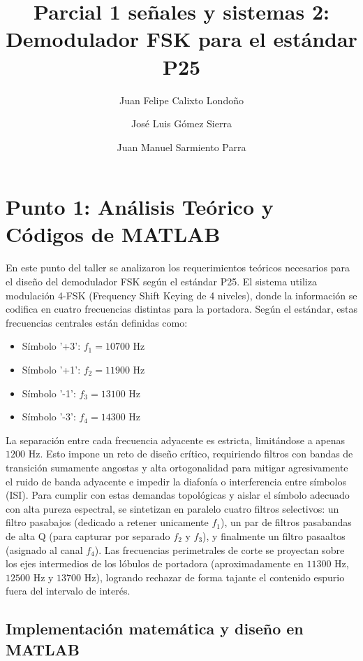 \documentclass[9pt,a4paper,oneside]{rho-class/rho}
\title{Parcial 1 señales y sistemas 2: Demodulador FSK para el estándar P25}
\author[a,1]{Juan Felipe Calixto Londoño}
\author[a,2]{José Luis Gómez Sierra}
\author[a,3]{Juan Manuel Sarmiento Parra}
\affil[a]{Universidad Nacional de Colombia, Facultad de Ingeniería}
\begin{document}
    \maketitle
    \thispagestyle{firststyle}


\section{Punto 1: Análisis Teórico y Códigos de MATLAB}

    En este punto del taller se analizaron los requerimientos teóricos necesarios para el diseño del demodulador FSK según el estándar P25. El sistema utiliza modulación 4-FSK (Frequency Shift Keying de 4 niveles), donde la información se codifica en cuatro frecuencias distintas para la portadora. Según el estándar, estas frecuencias centrales están definidas como:
    \begin{itemize}
        \item Símbolo '+3': $f_1 = 10700$ Hz
        \item Símbolo '+1': $f_2 = 11900$ Hz
        \item Símbolo '-1': $f_3 = 13100$ Hz
        \item Símbolo '-3': $f_4 = 14300$ Hz
    \end{itemize}
    La separación entre cada frecuencia adyacente es estricta, limitándose a apenas $1200$ Hz. Esto impone un reto de diseño crítico, requiriendo filtros con bandas de transición sumamente angostas y alta ortogonalidad para mitigar agresivamente el ruido de banda adyacente e impedir la diafonía o interferencia entre símbolos (ISI). Para cumplir con estas demandas topológicas y aislar el símbolo adecuado con alta pureza espectral, se sintetizan en paralelo cuatro filtros selectivos: un filtro pasabajos (dedicado a retener unicamente $f_1$), un par de filtros pasabandas de alta Q (para capturar por separado $f_2$ y $f_3$), y finalmente un filtro pasaaltos (asignado al canal $f_4$). Las frecuencias perimetrales de corte se proyectan sobre los ejes intermedios de los lóbulos de portadora (aproximadamente en $11300$ Hz, $12500$ Hz y $13700$ Hz), logrando rechazar de forma tajante el contenido espurio fuera del intervalo de interés.

    \subsection{Implementación matemática y diseño en MATLAB}
\end{document}
